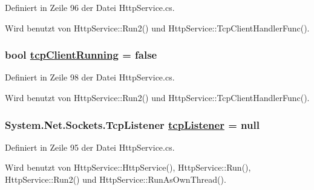 Definiert in Zeile 96 der Datei Http\-Service.cs.

Wird benutzt von Http\-Service::Run2() und Http\-Service::Tcp\-Client\-Handler\-Func().\hypertarget{classQbeSAS_1_1HttpService_QbeSAS_1_1HttpServicer19}{
\subsubsection[tcpClientRunning]{\setlength{\rightskip}{0pt plus 5cm}bool \hyperlink{classQbeSAS_1_1HttpService_QbeSAS_1_1HttpServicer19}{tcp\-Client\-Running} = false}}
\label{classQbeSAS_1_1HttpService_QbeSAS_1_1HttpServicer19}




Definiert in Zeile 98 der Datei Http\-Service.cs.

Wird benutzt von Http\-Service::Run2() und Http\-Service::Tcp\-Client\-Handler\-Func().\hypertarget{classQbeSAS_1_1HttpService_QbeSAS_1_1HttpServicer16}{
\subsubsection[tcpListener]{\setlength{\rightskip}{0pt plus 5cm}System.Net.Sockets.Tcp\-Listener \hyperlink{classQbeSAS_1_1HttpService_QbeSAS_1_1HttpServicer16}{tcp\-Listener} = null}}
\label{classQbeSAS_1_1HttpService_QbeSAS_1_1HttpServicer16}




Definiert in Zeile 95 der Datei Http\-Service.cs.

Wird benutzt von Http\-Service::Http\-Service(), Http\-Service::Run(), Http\-Service::Run2() und Http\-Service::Run\-As\-Own\-Thread().